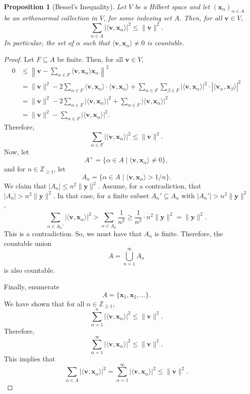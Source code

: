 \documentclass[a4paper, openany]{memoir}
\theoremstyle{definition}
\theoremstyle{plain}
\newtheorem{proposition}[definition]{Proposition}
\begin{document}
    \begin{proposition}[Bessel's Inequality]
        Let $V$ be a Hilbert space and let $(\bm{x}_\alpha)_{\alpha \in A}$ be an orthonormal collection in $V$, for some indexing set $A$. Then, for all $\bm{v} \in V$,
        \[\sum_{\alpha \in A} |\langle \bm{v}, \bm{x}_\alpha \rangle|^2 \leq \lVert \bm{v} \rVert^2.\]
        In particular, the set of $\alpha$ such that $\langle \bm{v}, \bm{x}_\alpha \rangle \neq 0$ is countable.
    \end{proposition}
    \begin{proof}
        Let $F \subseteq A$ be finite. Then, for all $\bm{v} \in V$,
        \begin{align*}
            0 &\leq \left\lVert \bm{v} - \sum_{\alpha \in F} \langle \bm{v}, \bm{x}_\alpha \rangle \bm{x}_\alpha \right\rVert^2 \\
            &= \lVert \bm{v} \rVert^2 - 2 \sum_{\alpha \in F} \langle \bm{v}, \bm{x}_\alpha \rangle \cdot \langle \bm{v}, \bm{x}_\alpha \rangle + \sum_{\alpha \in F} \sum_{\beta \in F} |\langle \bm{v}, \bm{x}_\alpha \rangle|^2 \cdot |\langle \bm{v}_\alpha, \bm{x}_\beta \rangle|^2 \\
            &= \lVert \bm{v} \rVert^2 - 2 \sum_{\alpha \in F} |\langle \bm{v}, \bm{x}_\alpha \rangle|^2 + \sum_{\alpha \in F} |\langle \bm{v}, \bm{x}_\alpha \rangle|^2 \\
            &= \lVert \bm{v} \rVert^2 - \sum_{\alpha \in F} |\langle \bm{v}, \bm{x}_\alpha \rangle|^2.
        \end{align*}
        Therefore,
        \[\sum_{\alpha \in F} |\langle \bm{v}, \bm{x}_\alpha \rangle|^2 \leq \lVert \bm{v} \rVert^2.\]
        Now, let
        \[A^\times = \{\alpha \in A \mid \langle \bm{v}, \bm{x}_\alpha \rangle \neq 0\},\]
        and for $n \in \mathbb{Z}_{\geq 1}$, let
        \[A_n = \{\alpha \in A \mid \langle \bm{v}, \bm{x}_\alpha \rangle > 1/n\}.\]
        We claim that $|A_n| \leq n^2 \lVert \bm{y} \rVert^2$. Assume, for a contradiction, that $|A_n| > n^2 \lVert \bm{y} \rVert^2$. In that case, for a finite subset $A_n' \subseteq A_n$ with $|A_n'| > n^2 \lVert \bm{y} \rVert^2$,
        \[\sum_{\alpha \in A_n'} |\langle \bm{v}, \bm{x}_\alpha \rangle|^2 > \sum_{\alpha \in A_n} \frac{1}{n^2} \geq \frac{1}{n^2} \cdot n^2 \lVert \bm{y} \rVert^2 = \lVert \bm{y} \rVert^2.\]
        This is a contradiction. So, we must have that $A_n$ is finite. Therefore, the countable union
        \[A = \bigcup_{n=1}^\infty A_n\]
        is also countable.

        \noindent Finally, enumerate
        \[A = \{\bm{x}_1, \bm{x}_2, \dots\}.\]
        We have shown that for all $n \in \mathbb{Z}_{\geq 1}$,
        \[\sum_{\alpha=1}^n |\langle \bm{v}, \bm{x}_\alpha \rangle|^2 \leq \lVert \bm{v} \rVert^2.\]
        Therefore,
        \[\sum_{\alpha=1}^\infty |\langle \bm{v}, \bm{x}_\alpha \rangle|^2 \leq \lVert \bm{v} \rVert^2.\]
        This implies that
        \[\sum_{\alpha \in A} |\langle \bm{v}, \bm{x}_\alpha \rangle|^2 = \sum_{\alpha=1}^\infty |\langle \bm{v}, \bm{x}_\alpha \rangle|^2 \leq \lVert \bm{v} \rVert^2.\]
    \end{proof}
\end{document}
